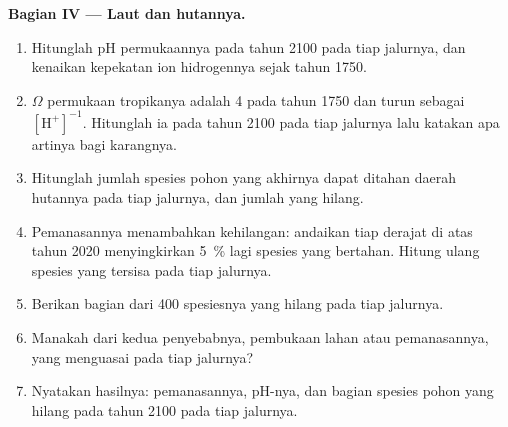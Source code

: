 \begin{problem}
\medskip
\noindent\textbf{Bagian IV --- Laut dan hutannya.}
\begin{enumerate}[resume]
  \item Hitunglah pH permukaannya pada tahun 2100 pada tiap jalurnya,
        dan kenaikan kepekatan ion hidrogennya sejak tahun 1750.
  \item {} $\Omega$ permukaan tropikanya adalah 4 pada
        tahun 1750 dan turun sebagai $[\ensuremath{\mathrm{H^{+}}}]^{-1}$. Hitunglah ia
        pada tahun 2100 pada tiap jalurnya lalu katakan apa artinya
        bagi karangnya.
  \item Hitunglah jumlah spesies pohon yang akhirnya dapat ditahan
        daerah hutannya pada tiap jalurnya, dan jumlah yang hilang.
  \item Pemanasannya menambahkan kehilangan: andaikan tiap derajat di
        atas tahun 2020 menyingkirkan \qty{5}{\%} lagi spesies yang
        bertahan. Hitung ulang spesies yang tersisa pada tiap jalurnya.
  \item Berikan bagian dari 400 spesiesnya yang hilang pada tiap
        jalurnya.
  \item Manakah dari kedua penyebabnya, pembukaan lahan atau
        pemanasannya, yang menguasai pada tiap jalurnya?
  \item Nyatakan hasilnya: pemanasannya, pH-nya, dan bagian spesies
        pohon yang hilang pada tahun 2100 pada tiap jalurnya.
\end{enumerate}
\end{problem}
